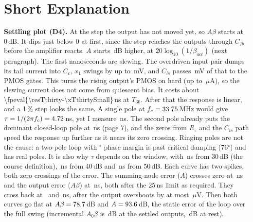 \documentclass[11pt,a4paper]{article}
\newcommand{\dd}[2][2]{\edef\ddtmp{\fpeval{#2}}\num[round-mode=places,round-precision=#1]{\ddtmp}}
\begin{document}
\section*{Short Explanation}
\small\setlength{\parskip}{2pt}\setlength{\abovedisplayskip}{3pt}\setlength{\belowdisplayskip}{3pt}
\textbf{Settling plot (D4).} At the step the output has not moved yet, so $A\beta$ starts at 0\,dB. It dips just
below 0 at first, since the step reaches the outputs through $C_{fb}$ before the amplifier reacts. $A$ starts
\resGapdB\,dB higher, at $20\log_{10}(1/\beta_{act})$ (next paragraph). The first nanoseconds are slewing. The overdriven input pair dumps its tail
current into $C_c$, $x_1$ swings by up to \xXswing\,mV, and $C_{ls}$ passes \xGpswing\,mV of that to the PMOS gates.
This turns the rising output's PMOS on hard (up to \xIpk\,$\mu$A), so the slewing current does not come from
quiescent bias. It costs about \dd[1]{\resTthirty-\xTthirtySmall}\,ns at $T_{30}$. After that the response is linear,
and a 1\,\% step looks the same. A single pole at $f_c = 33.75$\,MHz would give $\tau = 1/(2\pi f_c) = 4.72$\,ns, yet I
measure \resTau\,ns. The second pole already puts the dominant closed-loop pole at \xTauTwoPole\,ns (page 7), and the
zeros from $R_z$ and the $C_{ls}$ path speed the response up further as it nears its zero crossing. Ringing poles are not the cause: a two-pole loop with \xPM$^\circ$ phase margin is past critical damping
(76$^\circ$) and has real poles. It is also why $\tau$ depends on the window, with \resTau\,ns from 30\,dB (the course
definition), \xTauWforty\,ns from 40\,dB and \xTauWfifty\,ns from 50\,dB. Each curve has two spikes, both zero crossings
of the error. The summing-node error ($A$) crosses zero at \resFirstPeakA\,ns and the output error ($A\beta$) at
\resFirstPeakAbeta\,ns, both after the 25\,ns limit as required. They cross back at \xZcBackA\ and \xZcBackAb\,ns, after
the output overshoots by at most \xOvershoot\,$\mu$V. Then both curves go flat at $A\beta = 78.7$\,dB and $A = 93.6$\,dB, the static error of
the loop over the full swing (incremental $A_0\beta$ is \xTzeroExt\,dB at the settled outputs, \xTzero\,dB at rest).
\end{document}
